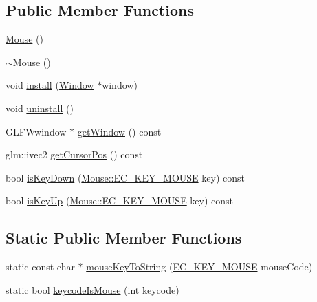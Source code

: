 \subsection*{Public Member Functions}
\begin{DoxyCompactItemize}
\item 
\mbox{\hyperlink{classec_1_1_mouse_ac1154831feadd646ecabad6dc1d42136}{Mouse}} ()
\item 
\mbox{\hyperlink{classec_1_1_mouse_a49441335e64c7bf098217f0698975aa4}{$\sim$\+Mouse}} ()
\item 
void \mbox{\hyperlink{classec_1_1_mouse_a7e679de43ed15a8366d15ebf641c7b97}{install}} (\mbox{\hyperlink{classec_1_1_window}{Window}} $\ast$window)
\item 
void \mbox{\hyperlink{classec_1_1_mouse_afee0caa17130a35f9b94523776a6fffb}{uninstall}} ()
\item 
G\+L\+F\+Wwindow $\ast$ \mbox{\hyperlink{classec_1_1_mouse_a7daf494a5600c6ffa5278e201b68963f}{get\+Window}} () const
\item 
glm\+::ivec2 \mbox{\hyperlink{classec_1_1_mouse_ac78aee81c618536c76a74852d344128d}{get\+Cursor\+Pos}} () const
\item 
bool \mbox{\hyperlink{classec_1_1_mouse_a3d5fd51a99aae2800604ecc5cb01ae21}{is\+Key\+Down}} (\mbox{\hyperlink{classec_1_1_mouse_acabdd3509adc381e415c60b29554e2fb}{Mouse\+::\+E\+C\+\_\+\+K\+E\+Y\+\_\+\+M\+O\+U\+SE}} key) const
\item 
bool \mbox{\hyperlink{classec_1_1_mouse_a0e7b2dc5f3b7b9ea2a348fa7a44fb629}{is\+Key\+Up}} (\mbox{\hyperlink{classec_1_1_mouse_acabdd3509adc381e415c60b29554e2fb}{Mouse\+::\+E\+C\+\_\+\+K\+E\+Y\+\_\+\+M\+O\+U\+SE}} key) const
\end{DoxyCompactItemize}
\subsection*{Static Public Member Functions}
\begin{DoxyCompactItemize}
\item 
static const char $\ast$ \mbox{\hyperlink{classec_1_1_mouse_a8ea44f894f0467851d1a12747f8a5e4b}{mouse\+Key\+To\+String}} (\mbox{\hyperlink{classec_1_1_mouse_acabdd3509adc381e415c60b29554e2fb}{E\+C\+\_\+\+K\+E\+Y\+\_\+\+M\+O\+U\+SE}} mouse\+Code)
\item 
static bool \mbox{\hyperlink{classec_1_1_mouse_a6c43132b82c3d730515c3f6c8cf9e142}{keycode\+Is\+Mouse}} (int keycode)
\end{DoxyCompactItemize}
